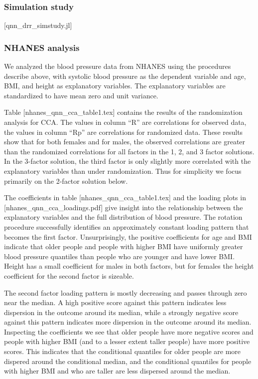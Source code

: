 \subsubsection{Simulation study}

[qnn_drr_simstudy.jl]

\subsubsection{NHANES analysis}

We analyzed the blood pressure data from NHANES using the procedures
describe above, with systolic blood pressure as the dependent variable
and age, BMI, and height as explanatory variables.  The explanatory
variables are standardized to have mean zero and unit variance.

Table [nhanes_qnn_cca_table1.tex] contains the results of the
randomization analysis for CCA.  The values in column ``R'' are
correlations for observed data, the values in column ``Rp'' are
correlations for randomized data.  These results show that for both
females and for males, the observed correlations are greater than
the randomized correlations for all factors in the 1, 2, and 3 factor
solutions.  In the 3-factor solution, the third factor is only slightly
more correlated with the explanatory variables than under randomization.
Thus for simplicity we focus primarily on the 2-factor solution below.

The coefficients in table [nhanes_qnn_cca_table1.tex] and the loading
plots in [nhanes_qnn_cca_loadings.pdf] give insight into the relationship
between the explanatory variables and the full distribution of blood
pressure. The rotation procedure successfully identifies an approximately
constant loading pattern that becomes the first factor.  Unsurprisingly,
the positive coefficients for age and BMI indicate that older people and
people with higher BMI have uniformly greater blood pressure quantiles
than people who are younger and have lower BMI. Height has a small
coefficient for males in both factors, but for females the height
coefficient for the second factor is sizeable.

The second factor loading pattern is mostly decreasing and passes through
zero near the median.  A high positive score against this pattern
indicates less dispersion in the outcome around its median, while a
strongly negative score against this pattern indicates more dispersion in
the outcome around its median.  Inspecting the coefficients we see that
older people have more negative scores and people with higher BMI (and to
a lesser extent taller people) have more positive scores.  This indicates
that the conditional quantiles for older people are more dispered around
the conditional median, and the conditional quantiles for people with
higher BMI and who are taller are less dispersed around the median.

